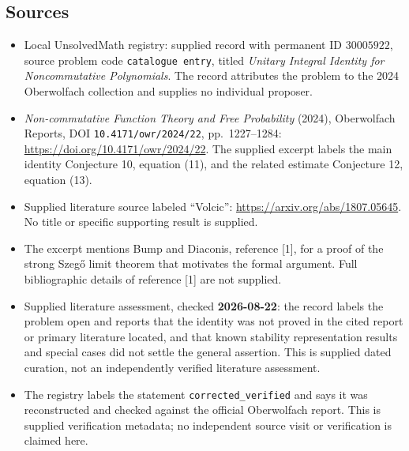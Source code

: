 \documentclass[11pt]{article}
\begin{document}
\subsection{Sources}
\begin{itemize}
\item Local UnsolvedMath registry: supplied record with permanent ID \(30005922\), source problem code \texttt{catalogue entry}, titled \emph{Unitary Integral Identity for Noncommutative Polynomials}. The record attributes the problem to the 2024 Oberwolfach collection and supplies no individual proposer.
\item \emph{Non-commutative Function Theory and Free Probability} (2024), Oberwolfach Reports, DOI \texttt{10.4171/owr/2024/22}, pp.~1227--1284: \url{https://doi.org/10.4171/owr/2024/22}. The supplied excerpt labels the main identity Conjecture 10, equation (11), and the related estimate Conjecture 12, equation (13).
\item Supplied literature source labeled ``Volcic'': \url{https://arxiv.org/abs/1807.05645}. No title or specific supporting result is supplied.
\item The excerpt mentions Bump and Diaconis, reference [1], for a proof of the strong Szeg\H{o} limit theorem that motivates the formal argument. Full bibliographic details of reference [1] are not supplied.
\item Supplied literature assessment, checked \textbf{2026-08-22}: the record labels the problem open and reports that the identity was not proved in the cited report or primary literature located, and that known stability representation results and special cases did not settle the general assertion. This is supplied dated curation, not an independently verified literature assessment.
\item The registry labels the statement \texttt{corrected\_verified} and says it was reconstructed and checked against the official Oberwolfach report. This is supplied verification metadata; no independent source visit or verification is claimed here.
\end{itemize}
\end{document}
